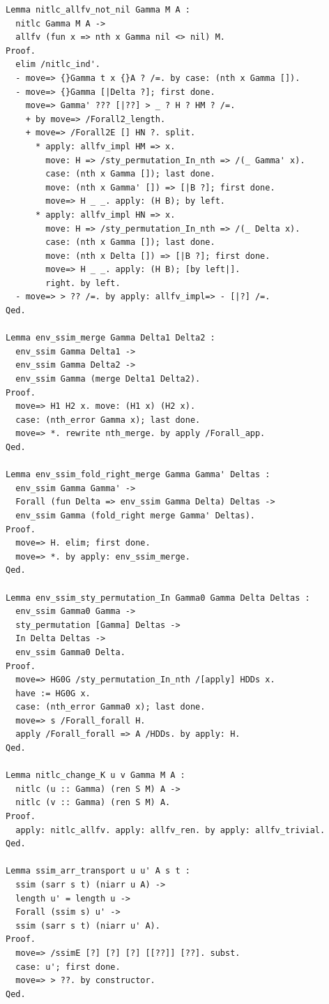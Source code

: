 \documentclass[10pt,a4paper]{article}
\begin{document}
\begin{lstlisting}[style=authorcoq]
Lemma nitlc_allfv_not_nil Gamma M A :
  nitlc Gamma M A ->
  allfv (fun x => nth x Gamma nil <> nil) M.
Proof.
  elim /nitlc_ind'.
  - move=> {}Gamma t x {}A ? /=. by case: (nth x Gamma []).
  - move=> {}Gamma [|Delta ?]; first done.
    move=> Gamma' ??? [|??] > _ ? H ? HM ? /=.
    + by move=> /Forall2_length.
    + move=> /Forall2E [] HN ?. split.
      * apply: allfv_impl HM => x.
        move: H => /sty_permutation_In_nth => /(_ Gamma' x).
        case: (nth x Gamma []); last done.
        move: (nth x Gamma' []) => [|B ?]; first done.
        move=> H _ _. apply: (H B); by left.
      * apply: allfv_impl HN => x.
        move: H => /sty_permutation_In_nth => /(_ Delta x).
        case: (nth x Gamma []); last done.
        move: (nth x Delta []) => [|B ?]; first done.
        move=> H _ _. apply: (H B); [by left|].
        right. by left.
  - move=> > ?? /=. by apply: allfv_impl=> - [|?] /=.
Qed.

Lemma env_ssim_merge Gamma Delta1 Delta2 :
  env_ssim Gamma Delta1 ->
  env_ssim Gamma Delta2 ->
  env_ssim Gamma (merge Delta1 Delta2).
Proof.
  move=> H1 H2 x. move: (H1 x) (H2 x).
  case: (nth_error Gamma x); last done.
  move=> *. rewrite nth_merge. by apply /Forall_app.
Qed.

Lemma env_ssim_fold_right_merge Gamma Gamma' Deltas :
  env_ssim Gamma Gamma' ->
  Forall (fun Delta => env_ssim Gamma Delta) Deltas ->
  env_ssim Gamma (fold_right merge Gamma' Deltas).
Proof.
  move=> H. elim; first done.
  move=> *. by apply: env_ssim_merge.
Qed.

Lemma env_ssim_sty_permutation_In Gamma0 Gamma Delta Deltas :
  env_ssim Gamma0 Gamma ->
  sty_permutation [Gamma] Deltas ->
  In Delta Deltas ->
  env_ssim Gamma0 Delta.
Proof.
  move=> HG0G /sty_permutation_In_nth /[apply] HDDs x.
  have := HG0G x.
  case: (nth_error Gamma0 x); last done.
  move=> s /Forall_forall H.
  apply /Forall_forall => A /HDDs. by apply: H.
Qed.

Lemma nitlc_change_K u v Gamma M A :
  nitlc (u :: Gamma) (ren S M) A ->
  nitlc (v :: Gamma) (ren S M) A.
Proof.
  apply: nitlc_allfv. apply: allfv_ren. by apply: allfv_trivial.
Qed.

Lemma ssim_arr_transport u u' A s t :
  ssim (sarr s t) (niarr u A) ->
  length u' = length u ->
  Forall (ssim s) u' ->
  ssim (sarr s t) (niarr u' A).
Proof.
  move=> /ssimE [?] [?] [?] [[??]] [??]. subst.
  case: u'; first done.
  move=> > ??. by constructor.
Qed.


\end{lstlisting}
\end{document}
